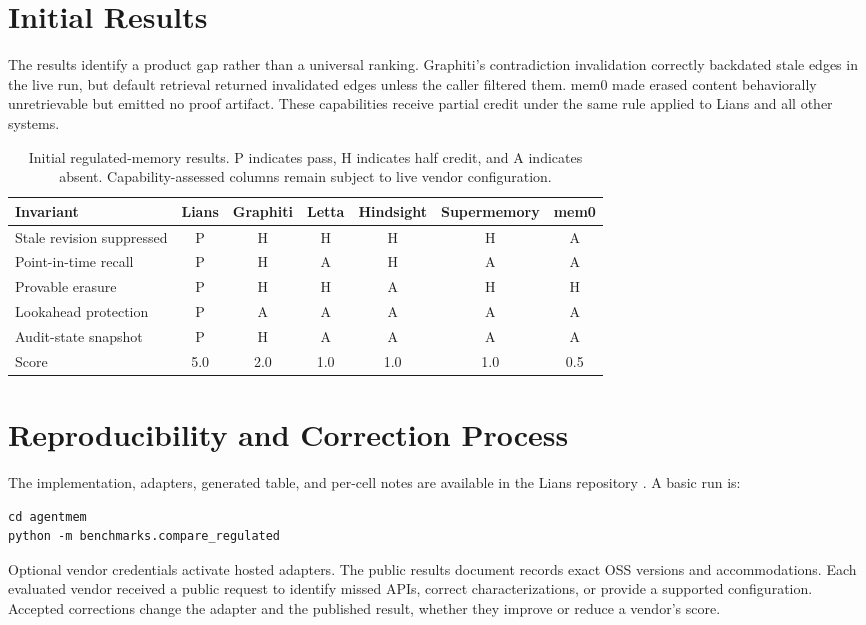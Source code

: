 \documentclass[11pt]{article}
\begin{document}
\section{Initial Results}
The results identify a product gap rather than a universal ranking. Graphiti's contradiction invalidation correctly backdated stale edges in the live run, but default retrieval returned invalidated edges unless the caller filtered them. mem0 made erased content behaviorally unretrievable but emitted no proof artifact. These capabilities receive partial credit under the same rule applied to Lians and all other systems.

\begin{table}[ht]
\centering
\small
\caption{Initial regulated-memory results. P indicates pass, H indicates half credit, and A indicates absent. Capability-assessed columns remain subject to live vendor configuration.}
\label{tab:results}
\begin{tabular}{lcccccc}
\toprule
Invariant & Lians & Graphiti & Letta & Hindsight & Supermemory & mem0 \\
\midrule
Stale revision suppressed & P & H & H & H & H & A \\
Point-in-time recall & P & H & A & H & A & A \\
Provable erasure & P & H & H & A & H & H \\
Lookahead protection & P & A & A & A & A & A \\
Audit-state snapshot & P & H & A & A & A & A \\
\midrule
Score & 5.0 & 2.0 & 1.0 & 1.0 & 1.0 & 0.5 \\
\bottomrule
\end{tabular}
\end{table}

\section{Reproducibility and Correction Process}
The implementation, adapters, generated table, and per-cell notes are available in the Lians repository \cite{lians}. A basic run is:
\begin{verbatim}
cd agentmem
python -m benchmarks.compare_regulated
\end{verbatim}
Optional vendor credentials activate hosted adapters. The public results document records exact OSS versions and accommodations. Each evaluated vendor received a public request to identify missed APIs, correct characterizations, or provide a supported configuration. Accepted corrections change the adapter and the published result, whether they improve or reduce a vendor's score.
\end{document}
